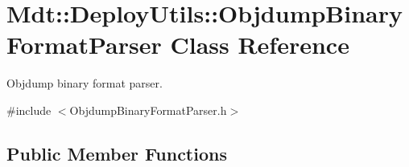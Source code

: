 \hypertarget{class_mdt_1_1_deploy_utils_1_1_objdump_binary_format_parser}{}\section{Mdt\+:\+:Deploy\+Utils\+:\+:Objdump\+Binary\+Format\+Parser Class Reference}
\label{class_mdt_1_1_deploy_utils_1_1_objdump_binary_format_parser}


Objdump binary format parser.  




{\ttfamily \#include $<$Objdump\+Binary\+Format\+Parser.\+h$>$}

\subsection*{Public Member Functions}
